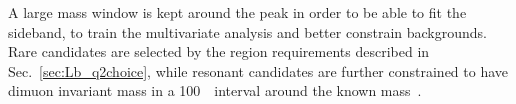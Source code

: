 A large mass window is kept around the \Lb peak in order to be able
to fit the sideband, to train the multivariate analysis and better constrain backgrounds.
Rare candidates are selected by the \qsq region requirements described in Sec.~\ref{sec:Lb_q2choice},
while resonant candidates are further constrained to have dimuon invariant mass
in a 100~\mevcc~interval around the known \jpsi mass~\cite{PDG2014}.

